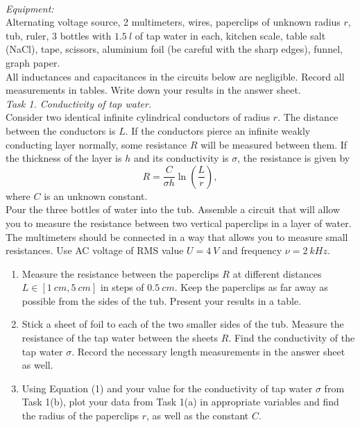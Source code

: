 \documentclass[../TST.tex]{subfiles}
\begin{document}
\begin{eproblem}{\ \\[5pt]}
\textit{Equipment:}\\
Alternating voltage source, 2 multimeters, wires, paperclips of unknown radius $r$, tub, ruler, 3 bottles with $\qty{1.5}{l}$ of tap water in each, kitchen scale, table salt (NaCl), tape, scissors, aluminium foil (be careful with the sharp edges), funnel, graph paper. \\

All inductances and capacitances in the circuits below are negligible. Record all measurements in tables. Write down your results in the answer sheet.\\

\textit{Task 1. Conductivity of tap water.}\\
Consider two identical infinite cylindrical conductors of radius $r$. The distance between the conductors is $L$. If the conductors pierce an infinite weakly conducting layer normally, some resistance $R$ will be measured between them. If the thickness of the layer is $h$ and its conductivity is $\sigma$, the resistance is given by
\begin{equation}
	R=\frac{C}{\sigma h}\ln{\left(\frac{L}{r}\right)}
,
\end{equation}
where $C$ is an unknown constant. \\

Pour the three bottles of water into the tub. Assemble a circuit that will allow you to measure the resistance between two vertical paperclips in a layer of water.  The multimeters should be connected in a way that allows you to measure small resistances. Use AC voltage of RMS value $U=\qty{4}{V}$ and frequency $\nu=\qty{2}{kHz}$.
\begin{enumerate}
	\item  Measure the resistance between the paperclips $R$ at different distances $L\in [\qty{1}{cm}, \qty{5}{cm}]$ in steps of $\qty{0.5}{cm}$. Keep the paperclips as far away as possible from the sides of the tub. Present your results in a table.
	\item  Stick a sheet of foil to each of the two smaller sides of the tub. Measure the resistance of the tap water between the sheets $R$. Find the conductivity of the tap water $\sigma$. Record the necessary length measurements in the answer sheet as well.  
	\item  Using Equation (1) and your value for the conductivity of tap water $\sigma$ from Task 1(b), plot your data from Task 1(a) in appropriate variables and find the radius of the paperclips $r$, as well as the constant $C$. \\
\end{enumerate}


\end{eproblem}
\end{document}
